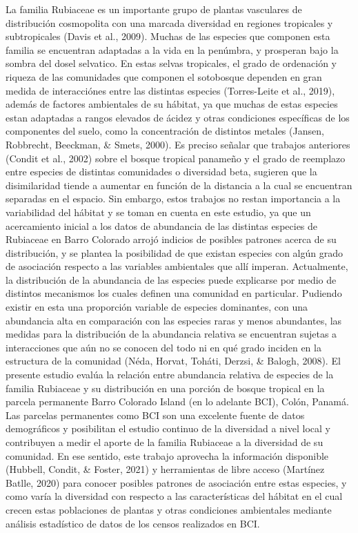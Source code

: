 \documentclass[11pt,]{article}
\begin{document}
La familia Rubiaceae es un importante grupo de plantas vasculares de
distribución cosmopolita con una marcada diversidad en regiones
tropicales y subtropicales (Davis et al., 2009). Muchas de las especies
que componen esta familia se encuentran adaptadas a la vida en la
penúmbra, y prosperan bajo la sombra del dosel selvatico. En estas
selvas tropicales, el grado de ordenación y riqueza de las comunidades
que componen el sotobosque dependen en gran medida de interacciónes
entre las distintas especies (Torres-Leite et al., 2019), además de
factores ambientales de su hábitat, ya que muchas de estas especies
estan adaptadas a rangos elevados de ácidez y otras condiciones
específicas de los componentes del suelo, como la concentración de
distintos metales (Jansen, Robbrecht, Beeckman, \& Smets, 2000). Es
preciso señalar que trabajos anteriores (Condit et al., 2002) sobre el
bosque tropical panameño y el grado de reemplazo entre especies de
distintas comunidades o diversidad beta, sugieren que la disimilaridad
tiende a aumentar en función de la distancia a la cual se encuentran
separadas en el espacio. Sin embargo, estos trabajos no restan
importancia a la variabilidad del hábitat y se toman en cuenta en este
estudio, ya que un acercamiento inicial a los datos de abundancia de las
distintas especies de Rubiaceae en Barro Colorado arrojó indicios de
posibles patrones acerca de su distribución, y se plantea la posibilidad
de que existan especies con algún grado de asociación respecto a las
variables ambientales que allí imperan. Actualmente, la distribución de
la abundancia de las especies puede explicarse por medio de distintos
mecanismos los cuales definen una comunidad en particular. Pudiendo
existir en esta una proporción variable de especies dominantes, con una
abundancia alta en comparación con las especies raras y menos
abundantes, las medidas para la distribución de la abundancia relativa
se encuentran sujetas a interacciones que aún no se conocen del todo ni
en qué grado inciden en la estructura de la comunidad (Néda, Horvat,
Toháti, Derzsi, \& Balogh, 2008). El presente estudio evalúa la relación
entre abundancia relativa de especies de la familia Rubiaceae y su
distribución en una porción de bosque tropical en la parcela permanente
Barro Colorado Island (en lo adelante BCI), Colón, Panamá. Las parcelas
permanentes como BCI son una excelente fuente de datos demográficos y
posibilitan el estudio continuo de la diversidad a nivel local y
contribuyen a medir el aporte de la familia Rubiaceae a la diversidad de
su comunidad. En ese sentido, este trabajo aprovecha la información
disponible (Hubbell, Condit, \& Foster, 2021) y herramientas de libre
acceso (Martínez Batlle, 2020) para conocer posibles patrones de
asociación entre estas especies, y como varía la diversidad con respecto
a las características del hábitat en el cual crecen estas poblaciones de
plantas y otras condiciones ambientales mediante análisis estadístico de
datos de los censos realizados en BCI.
\end{document}
